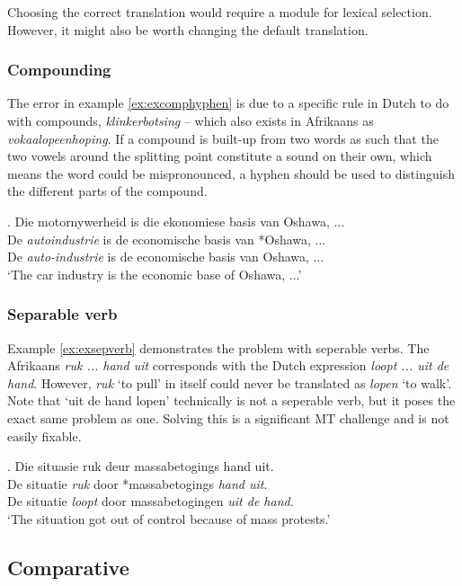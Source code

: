 \documentclass[11pt]{article}
\begin{document}
Choosing the correct translation would require a module for lexical selection. However, it might also
be worth changing the default translation.

\subsubsection{Compounding}
The error in example \ref{ex:excomphyphen} is due to a specific rule in Dutch to do with 
compounds, \emph{klinkerbotsing} -- which also exists in Afrikaans 
as \emph{vokaalopeenhoping}. If a compound is built-up from two words as such 
that the two vowels around the splitting point constitute a sound on their own, 
which means the word could be mispronounced, a hyphen should be used to distinguish 
the different parts of the compound. 

\ex. \label{ex:excomphyphen} 
    Die motornywerheid is die ekonomiese basis van Oshawa, ...  \\
    De {\em autoindustrie} is de economische basis van *Oshawa, ... \\
    De {\em auto-industrie} is de economische basis van Oshawa, ... \\
   `The car industry is the economic base of Oshawa, ...'


\subsubsection{Separable verb}

Example \ref{ex:exsepverb} demonstrates the problem with seperable verbs. The 
Afrikaans \emph{ruk ... hand uit} corresponds with the Dutch expression
\emph{loopt ... uit de hand}. However, \emph{ruk} `to pull' in itself 
could never be translated as \emph{lopen} `to walk'. Note that `uit de hand lopen' 
 technically is not a seperable verb, but it poses the exact same problem as one.
Solving this is a significant MT challenge and is not easily fixable.  

\ex. \label{ex:exsepverb} 
    Die situasie ruk deur massabetogings hand uit. \\
    De situatie {\em *ruk} door *massabetogings {\em hand uit}. \\
    De situatie {\em loopt} door massabetogingen {\em uit de hand}. \\
    `The situation got out of control because of mass protests.'



\subsection{Comparative}
\end{document}
